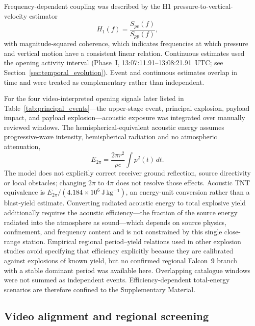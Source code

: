 \documentclass[]{seismica}
\begin{document}
Frequency-dependent coupling was described by the H1 pressure-to-vertical-velocity estimator
\begin{equation}
 H_1(f)=\frac{S_{pv}(f)}{S_{pp}(f)},
 \label{eq:h1_transfer}
\end{equation}
with magnitude-squared coherence, which indicates frequencies at which
pressure and vertical motion have a consistent linear relation. Continuous estimates used the opening activity interval
(Phase~I, 13:07:11.91--13:08:21.91~UTC; see Section~\ref{sec:temporal_evolution}).
Event and continuous estimates overlap in time and were treated as
complementary rather than independent.

For the four video-interpreted opening signals later listed in
Table~\ref{tab:principal_events}---the upper-stage event, principal explosion,
payload impact, and payload explosion---acoustic exposure
was integrated over manually reviewed windows. The hemispherical-equivalent
acoustic energy assumes progressive-wave intensity, hemispherical radiation
and no atmospheric attenuation,
\begin{equation}
 E_{2\pi}=\frac{2\pi r^2}{\rho c}\int p^2(t)\,dt.
 \label{eq:acoustic_energy}
\end{equation}
The model does not explicitly correct receiver ground reflection, source
directivity or local obstacles; changing $2\pi$ to $4\pi$ does not resolve
those effects. Acoustic TNT equivalence is $E_{2\pi}/(4.184\times10^6~\mathrm{J\,kg^{-1}})$,
an energy-unit conversion rather than a blast-yield estimate. Converting
radiated acoustic energy to total explosive yield additionally requires the
acoustic efficiency---the fraction of the source energy radiated into the
atmosphere as sound---which depends on source physics, confinement, and
frequency content and is not constrained by this single close-range station.
Empirical regional period--yield relations used in other explosion studies
avoid specifying that efficiency explicitly because they are calibrated
against explosions of known yield, but no confirmed regional Falcon~9 branch
with a stable dominant period was available here. Overlapping catalogue
windows were not summed as independent events. Efficiency-dependent
total-energy scenarios are therefore confined to the Supplementary Material.

\subsection{Video alignment and regional screening}
\end{document}
